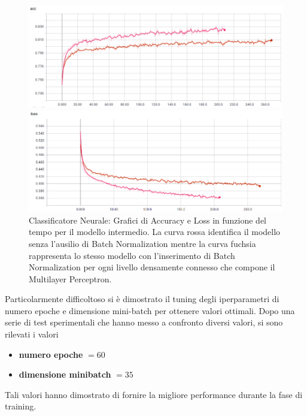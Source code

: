 \begin{figure}[!bp] 
	\begin{minipage}[t]{\linewidth}
		\includegraphics[width=\linewidth]{figures/MLP_batchnorm1.png}
	\end{minipage}\hfill
	\begin{minipage}[b]{\linewidth}
		\includegraphics[width=\linewidth]{figures/MLP_batchnorm2.png}
	\end{minipage}
	\caption{Classificatore Neurale: Grafici di Accuracy e Loss in funzione del tempo per il modello intermedio. La curva rossa identifica il modello senza l'ausilio di Batch Normalization mentre la curva fuchsia rappresenta lo stesso modello con l'inserimento di Batch Normalization per ogni livello densamente connesso che compone il Multilayer Perceptron. \label{fig:batchnorm}}
\end{figure}

Particolarmente difficoltoso si è dimostrato il tuning degli  iperparametri di numero epoche e dimensione mini-batch per ottenere valori ottimali. Dopo una serie di test sperimentali che hanno messo a confronto diversi valori, si sono rilevati i valori
\begin{itemize}
\item \textbf{numero epoche} $= 60$
\item \textbf{dimensione minibatch} $= 35$ 
\end{itemize}

Tali valori hanno dimostrato di fornire la migliore performance durante la fase di training.

